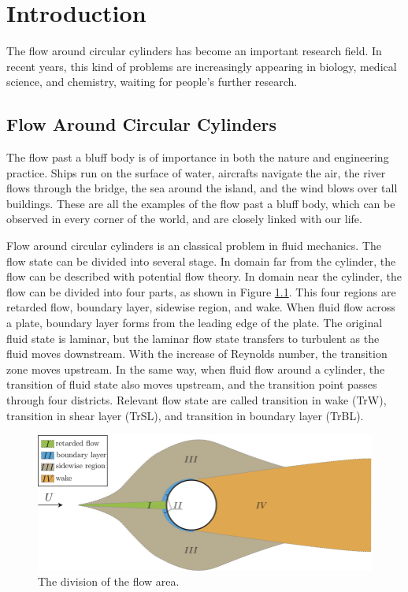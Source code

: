 \chapter{Introduction}
The flow around circular cylinders has become an important research field. In recent years, this kind of problems are increasingly appearing in biology, medical science, and chemistry, waiting for people's further research.


\section{Flow Around Circular Cylinders}
The flow past a bluff body is of importance in both the nature and engineering practice. Ships run on the surface of water, aircrafts navigate the air, the river flows through the bridge, the sea around the island, and the wind blows over tall buildings. These are all the examples of the flow past a bluff body, which can be observed in every corner of the world, and are closely linked with our life.

Flow around circular cylinders is an classical problem in fluid mechanics. The flow state can be divided into several stage\cite{Zdravkovich1997b}. In domain far from the cylinder, the flow can be described with potential flow theory. In domain near the cylinder, the flow can be divided into four parts, as shown in Figure \ref{fig: flow area}\cite{demartino2017aerodynamics}. This four regions are retarded flow, boundary layer, sidewise region, and wake. When fluid flow across a plate, boundary layer forms from the leading edge of the plate. The original fluid state is laminar, but the laminar flow state transfers to turbulent as the fluid moves downstream. With the increase of Reynolds number, the transition zone moves upstream. In the same way, when fluid flow around a cylinder, the transition of fluid state also moves upstream, and the transition point passes through four districts. Relevant flow state are called transition in wake (TrW), transition in shear layer (TrSL), and transition in boundary layer (TrBL).

\begin{figure}
	\centering
	\includegraphics[scale=.4]{figs/Regions-of-disturbed-flow-around-a-perfect-circular-cylinder}
	\caption{The division of the flow area\cite{demartino2017aerodynamics}.}
	\label{fig: flow area}
\end{figure}

